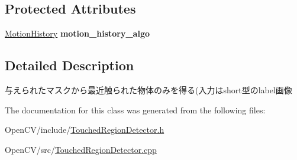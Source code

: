 \subsection*{Protected Attributes}
\begin{DoxyCompactItemize}
\item 
\hypertarget{classskl_1_1_touched_region_detector_aa1289b698bb2473f091f124f2a603cfa}{}\label{classskl_1_1_touched_region_detector_aa1289b698bb2473f091f124f2a603cfa} 
\hyperlink{classskl_1_1_motion_history}{Motion\+History} {\bfseries motion\+\_\+history\+\_\+algo}
\end{DoxyCompactItemize}


\subsection{Detailed Description}
与えられたマスクから最近触られた物体のみを得る(入力はshort型のlabel画像 

The documentation for this class was generated from the following files\+:\begin{DoxyCompactItemize}
\item 
Open\+C\+V/include/\hyperlink{_touched_region_detector_8h}{Touched\+Region\+Detector.\+h}\item 
Open\+C\+V/src/\hyperlink{_touched_region_detector_8cpp}{Touched\+Region\+Detector.\+cpp}\end{DoxyCompactItemize}
